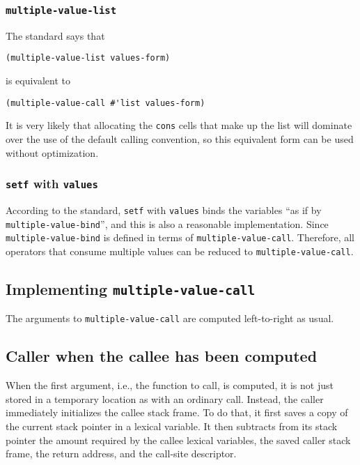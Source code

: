 \subsubsection{\texttt{multiple-value-list}}

The standard says that

\begin{verbatim}
(multiple-value-list values-form)
\end{verbatim}

is equivalent to

\begin{verbatim}
(multiple-value-call #'list values-form)
\end{verbatim}

It is very likely that allocating the \texttt{cons} cells that make up
the list will dominate over the use of the default calling convention,
so this equivalent form can be used without optimization. 

\subsubsection{\texttt{setf} with \texttt{values}}

According to the standard, \texttt{setf} with \texttt{values} binds
the variables ``as if by \texttt{multiple-value-bind}'', and this is
also a reasonable implementation.  Since \texttt{multiple-value-bind}
is defined in terms of \texttt{multiple-value-call}.  Therefore, all
operators that consume multiple values can be reduced to
\texttt{multiple-value-call}.

\subsection{Implementing \texttt{multiple-value-call}}

The arguments to \texttt{multiple-value-call} are computed
left-to-right as usual.

\subsection{Caller when the callee has been computed}

When the first argument, i.e., the function to call, is computed, it
is not just stored in a temporary location as with an ordinary call.
Instead, the caller immediately initializes the callee stack frame.
To do that, it first saves a copy of the current stack pointer in a
lexical variable.  It then subtracts from its stack pointer the amount
required by the callee lexical variables, the saved caller stack
frame, the return address, and the call-site descriptor.

